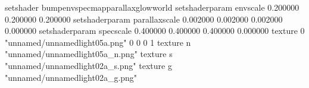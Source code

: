 setshader bumpenvspecmapparallaxglowworld
setshaderparam envscale 0.200000 0.200000 0.200000
setshaderparam parallaxscale 0.002000 0.002000 0.002000 0.000000
setshaderparam specscale 0.400000 0.400000 0.400000 0.000000
texture 0 "unnamed/unnamedlight05a.png" 0 0 0 1
texture n "unnamed/unnamedlight05a_n.png"
texture s "unnamed/unnamedlight02a_s.png"
texture g "unnamed/unnamedlight02a_g.png"